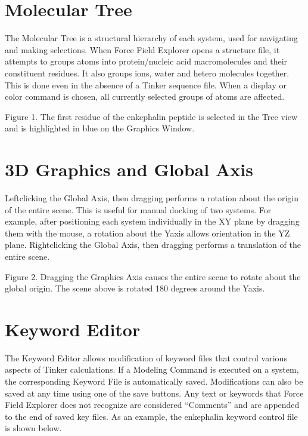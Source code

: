 \documentclass[letterpaper,11pt,english]{sphinxmanual}
\let\sphinxpxdimen\pdfpxdimen\else\newdimen\sphinxpxdimen
\begin{document}
\section{Molecular Tree}
\label{\detokenize{text/components:molecular-tree}}
\sphinxAtStartPar
The Molecular Tree is a structural hierarchy of each system, used for navigating and making selections. When Force Field Explorer opens a structure file, it attempts to groups atoms into protein/nucleic acid macromolecules and their constituent residues. It also groups ions, water and hetero molecules together. This is done even in the absence of a Tinker sequence file. When a display or color command is chosen, all currently selected groups of atoms are affected.

\noindent\sphinxincludegraphics[width=625\sphinxpxdimen]{{figure1}.png}

\sphinxAtStartPar
Figure 1. The first residue of the enkephalin peptide is selected in the Tree view and is highlighted in blue on the Graphics Window.


\section{3D Graphics and Global Axis}
\label{\detokenize{text/components:d-graphics-and-global-axis}}
\sphinxAtStartPar
Left\sphinxhyphen{}clicking the Global Axis, then dragging performs a rotation about the origin of the entire scene. This is useful for manual docking of two systems. For example, after positioning each system individually in the X\sphinxhyphen{}Y plane by dragging them with the mouse, a rotation about the Y\sphinxhyphen{}axis allows orientation in the Y\sphinxhyphen{}Z plane. Right\sphinxhyphen{}clicking the Global Axis, then dragging performs a translation of the entire scene.

\noindent\sphinxincludegraphics[width=625\sphinxpxdimen]{{figure2}.png}

\sphinxAtStartPar
Figure 2. Dragging the Graphics Axis causes the entire scene to rotate about the global origin. The scene above is rotated 180 degrees around the Y\sphinxhyphen{}axis.


\section{Keyword Editor}
\label{\detokenize{text/components:keyword-editor}}
\sphinxAtStartPar
The Keyword Editor allows modification of keyword files that control various aspects of Tinker calculations. If a Modeling Command is executed on a system, the corresponding Keyword File is automatically saved. Modifications can also be saved at any time using one of the save buttons. Any text or keywords that Force Field Explorer does not recognize are considered “Comments” and are appended to the end of saved key files. As an example, the enkephalin keyword control file is shown below.
\end{document}
